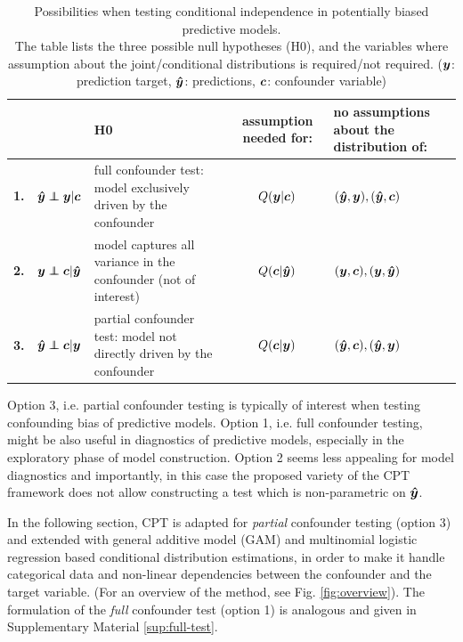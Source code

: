 \documentclass{article}
\begin{document}
\renewcommand{\arraystretch}{1.2}
\begin{table}[]
\centering
\begin{tabular}{l|rp{60mm}|c|>{\centering\arraybackslash}m{30mm}}
 &  & H0  & assumption needed for: & no assumptions about the distribution of: \\
\hline
\textbf{1.} & $\yhat \independent \y | \c$ \quad  & full confounder test: model exclusively driven by the confounder & $Q(\boldsymbol{y}|\boldsymbol{c})$ & $(\boldsymbol{\hat{y}},\boldsymbol{y}), (\boldsymbol{\hat{y}}, \boldsymbol{c})$ \\
\textbf{2.} & $\y \independent \c | \yhat$ \quad & model captures all variance in the confounder (not of interest) & $Q(\boldsymbol{c}|\boldsymbol{\hat{y}})$ & $(\boldsymbol{y}, \boldsymbol{c}), (\boldsymbol{y}, \boldsymbol{\hat{y}})$ \\
\textbf{3.} & $\yhat \independent \c | \y$  \quad &  partial confounder  test: model not directly driven by the confounder & $Q(\boldsymbol{c}|\boldsymbol{y})$ & $(\boldsymbol{\hat{y}}, \boldsymbol{c}), (\boldsymbol{\hat{y}}, \boldsymbol{y})$ \\
\end{tabular}
\caption{\label{tab:conditional-independence-cases} Possibilities when testing conditional independence in potentially biased predictive models. \\The table lists the three possible null hypotheses (H0), and the variables where assumption about the joint/conditional distributions is required/not required.   ($\boldsymbol{y}$: prediction target, $\boldsymbol{\hat{y}}$: predictions, $\boldsymbol{c}$: confounder variable) }
\end{table}

Option 3, i.e. partial confounder testing is typically of interest when testing confounding bias of predictive models. Option 1, i.e. full confounder testing, might be also useful in diagnostics of predictive models, especially in the exploratory phase of model construction. Option 2 seems less appealing for model diagnostics and importantly, in this case the proposed variety of the CPT framework does not allow constructing a test which is non-parametric on $\boldsymbol{\hat{y}}$.

In the following section, CPT is adapted for \emph{partial} confounder testing (option 3) and extended with general additive model\cite{hastie1987generalized} (GAM) and multinomial logistic regression\citep{bennett1966multiple, jones1975proability} based conditional distribution estimations, in order to make it handle categorical data and non-linear dependencies between the confounder and the target variable. (For an overview of the method, see Fig. \ref{fig:overview}). The formulation of the \emph{full} confounder test (option 1) is analogous and given in Supplementary Material \ref{sup:full-test}.
\end{document}
